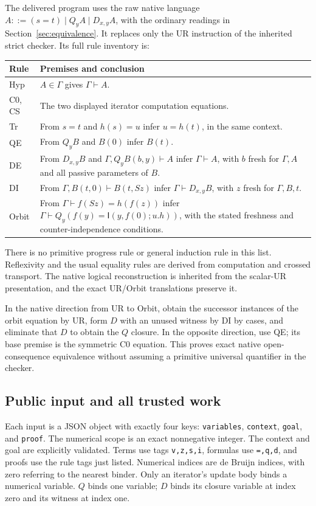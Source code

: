 \documentclass[11pt]{article}
\theoremstyle{definition}
\newcommand{\I}{\mathsf I}
\newcommand{\G}{\Gamma}
\begin{document}
The delivered program uses the raw native language
$A::=(s=t)\mid Q_yA\mid D_{x,y}A$, with the ordinary readings in Section~\ref{sec:equivalence}. It replaces only the UR instruction of the inherited strict checker. Its full rule inventory is:
\begin{center}
\small
\begin{tabular}{p{}p{}}
\toprule
Rule & Premises and conclusion\\
\midrule
Hyp & $A\in\G$ gives $\G\vdash A$.\\[4pt]
C0, CS & The two displayed iterator computation equations.\\[4pt]
Tr & From $s=t$ and $h(s)=u$ infer $u=h(t)$, in the same context.\\[4pt]
QE & From $Q_yB$ and $B(0)$ infer $B(t)$.\\[4pt]
DE & From $D_{x,y}B$ and $\G,Q_yB(b,y)\vdash A$ infer $\G\vdash A$, with $b$ fresh for $\G,A$ and all passive parameters of $B$.\\[4pt]
DI & From $\G,B(t,0)\vdash B(t,Sz)$ infer $\G\vdash D_{x,y}B$, with $z$ fresh for $\G,B,t$.\\[4pt]
Orbit & From $\G\vdash f(Sz)=h(f(z))$ infer $\G\vdash Q_y(f(y)=\I(y,f(0);u.h))$, with the stated freshness and counter-independence conditions.\\
\bottomrule
\end{tabular}
\end{center}
There is no primitive progress rule or general induction rule in this list. Reflexivity and the usual equality rules are derived from computation and crossed transport. The native logical reconstruction is inherited from the scalar-UR presentation, and the exact UR/Orbit translations preserve it.

In the native direction from UR to Orbit, obtain the successor instances of the orbit equation by UR, form $D$ with an unused witness by DI by cases, and eliminate that $D$ to obtain the $Q$ closure. In the opposite direction, use QE; its base premise is the symmetric C0 equation. This proves exact native open-consequence equivalence without assuming a primitive universal quantifier in the checker.

\subsection{Public input and all trusted work}

Each input is a JSON object with exactly four keys: \texttt{variables}, \texttt{context}, \texttt{goal}, and \texttt{proof}. The numerical scope is an exact nonnegative integer. The context and goal are explicitly validated. Terms use tags \texttt{v,z,s,i}, formulas use \texttt{=,q,d}, and proofs use the rule tags just listed. Numerical indices are de Bruijn indices, with zero referring to the nearest binder. Only an iterator's update body binds a numerical variable. $Q$ binds one variable; $D$ binds its closure variable at index zero and its witness at index one.
\end{document}
